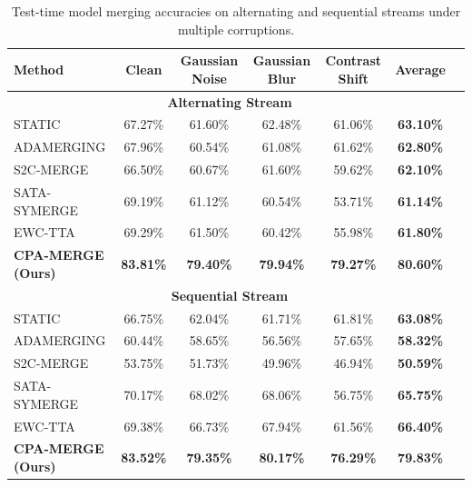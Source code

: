 \documentclass{article}
\theoremstyle{plain}
\theoremstyle{definition}
\theoremstyle{remark}
\begin{document}
\begin{table}[t]
\caption{Test-time model merging accuracies on alternating and sequential streams under multiple corruptions.}
\label{tab:main-results}
\vskip 0.15in
\begin{center}
\begin{small}
\begin{sc}
\begin{tabular}{lcccccr}
\toprule
Method & Clean & Gaussian Noise & Gaussian Blur & Contrast Shift & Average \\
\midrule
\multicolumn{6}{c}{\textbf{Alternating Stream}} \\
\midrule
STATIC & 67.27\% & 61.60\% & 62.48\% & 61.06\% & \textbf{63.10\%} \\
ADAMERGING & 67.96\% & 60.54\% & 61.08\% & 61.62\% & \textbf{62.80\%} \\
S2C-MERGE & 66.50\% & 60.67\% & 61.60\% & 59.62\% & \textbf{62.10\%} \\
SATA-SYMERGE & 69.19\% & 61.12\% & 60.54\% & 53.71\% & \textbf{61.14\%} \\
EWC-TTA & 69.29\% & 61.50\% & 60.42\% & 55.98\% & \textbf{61.80\%} \\
\textbf{CPA-MERGE (Ours)} & \textbf{83.81\%} & \textbf{79.40\%} & \textbf{79.94\%} & \textbf{79.27\%} & \textbf{80.60\%} \\
\midrule
\multicolumn{6}{c}{\textbf{Sequential Stream}} \\
\midrule
STATIC & 66.75\% & 62.04\% & 61.71\% & 61.81\% & \textbf{63.08\%} \\
ADAMERGING & 60.44\% & 58.65\% & 56.56\% & 57.65\% & \textbf{58.32\%} \\
S2C-MERGE & 53.75\% & 51.73\% & 49.96\% & 46.94\% & \textbf{50.59\%} \\
SATA-SYMERGE & 70.17\% & 68.02\% & 68.06\% & 56.75\% & \textbf{65.75\%} \\
EWC-TTA & 69.38\% & 66.73\% & 67.94\% & 61.56\% & \textbf{66.40\%} \\
\textbf{CPA-MERGE (Ours)} & \textbf{83.52\%} & \textbf{79.35\%} & \textbf{80.17\%} & \textbf{76.29\%} & \textbf{79.83\%} \\
\bottomrule
\end{tabular}
\end{sc}
\end{small}
\end{center}
\vskip -0.1in
\end{table}
\end{document}
